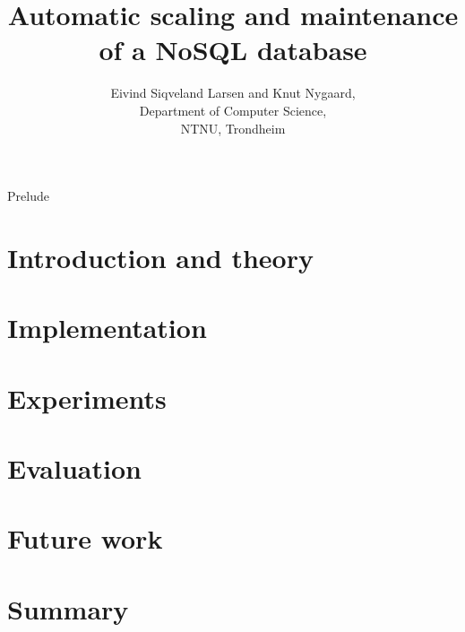 \documentclass[a4paper, 12pt]{report}
\title{Automatic scaling and maintenance of a NoSQL database}
\author{Eivind Siqveland Larsen and Knut Nygaard,\\
        Department of Computer Science,\\
        NTNU,
        Trondheim}
\begin{document}
\maketitle
\thispagestyle{empty}

\clearpage


\clearpage


\clearpage


\begin{titlepage}\centering
\vspace*{\fill}
\LARGE Prelude
\vspace*{\fill}
\end{titlepage}
\clearpage


\clearpage

\clearpage

\tableofcontents
\clearpage

\listoffigures
\clearpage
\setcounter{page}{1}

\chapter{Introduction and theory}
\label{chapter:introduction}


\clearpage


\clearpage


\clearpage


\clearpage



\clearpage


\clearpage

\chapter{Implementation}
\label{chapter:implementation}

\clearpage

\chapter{Experiments}
\label{chapter:results}



\chapter{Evaluation}
\label{chapter:evaluation}


\chapter{Future work}
\label{chapter:futurework}


\chapter{Summary}
\label{chapter:summary}




\end{document}
